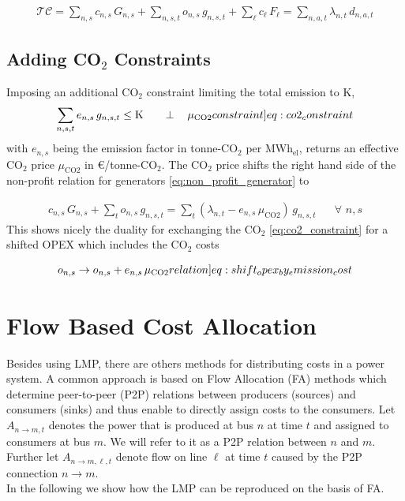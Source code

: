 \documentclass[11pt]{article}
\newcommand{\generation}{g_{n,s,t}}
\newcommand{\capacityGeneration}{G_{n,s}}
\newcommand{\capacityFlow}{F_{\ell}}
\newcommand{\capexGeneration}{c_{n,s}}
\newcommand{\capexFlow}{c_{\ell}}
\newcommand{\opexGeneration}{o_{n,s}}
\newcommand{\demand}[1][n]{d_{#1,a,t}}
\newcommand{\lmp}[1][n]{\lambda_{#1,t}}
\newcommand{\allocatePeer}{A_{n \rightarrow m,t}}
\newcommand{\allocateFlow}{A_{n \rightarrow m,\ell,t}}
\newcommand{\emission}{e_{n,s}}
\newcommand{\emissionPrice}{\mu_{\text{CO2}}}
\newcommand{\megawatthour}{MWh$_\text{el}$}
\newcommand{\totalcost}{\mathcal{TC}}
\newcommand{\resultsin}[1]{\hspace{20pt} \bot  \hspace{12pt} #1}
\newcommand{\Forall}[1]{\hspace{20pt} \forall \,\, #1}
\begin{document}
\begin{align}
\totalcost = \sum_{n,s} \capexGeneration \, \capacityGeneration + \sum_{n,s,t} \opexGeneration \, \generation + \sum_{\ell} \capexFlow \, \capacityFlow = \sum_{n,a,t} \lmp \, \demand 
\label{eq:total_system_cost}
\end{align}


\subsection*{Adding CO$_2$ Constraints}

Imposing an additional CO$_2$ constraint limiting the total emission to K,  
\begin{align}
 \sum_{n,s,t} \emission \, \generation \le \text{K} \resultsin{\emissionPrice} 
 \label[constraint]{eq:co2_constraint}
\end{align}
with $\emission$ being the emission factor in tonne-CO$_2$ per \megawatthour, returns an effective CO$_2$ price $\emissionPrice$ in \euro/tonne-CO$_2$. The CO$_2$ price shifts the right hand side of the non-profit relation for generators \cref{eq:non_profit_generator} to

\begin{align}
\capexGeneration \, \capacityGeneration + \sum_{t} \opexGeneration \, \generation = \sum_{t} \left( \lmp - \emission \, \emissionPrice \right)  \, \generation \Forall{n,s} 
\label{eq:non_profit_generator_emission}
\end{align}
This shows nicely the duality for exchanging the CO$_2$ \cref{eq:co2_constraint} for a shifted OPEX which includes the CO$_2$ costs

\begin{align}
\opexGeneration \rightarrow \opexGeneration + \emission \, \emissionPrice \label[relation]{eq:shift_opex_by_emission_cost}
\end{align}


\section*{Flow Based Cost Allocation}

Besides using LMP, there are others methods for distributing costs in a power system. A common approach is based on Flow Allocation (FA) methods which determine peer-to-peer (P2P) relations between producers (sources) and consumers (sinks) and thus enable to directly assign costs to the consumers. %
Let $\allocatePeer$ denotes the power that is produced at bus $n$ at time $t$ and assigned to consumers at bus $m$. We will refer to it as a P2P relation between $n$ and $m$. Further let $\allocateFlow$ denote flow on line $\ell$ at time $t$ caused by the P2P connection $n\rightarrow m$.\\
\noindent
In the following we show how the LMP can be reproduced on the basis of FA. 
\end{document}
